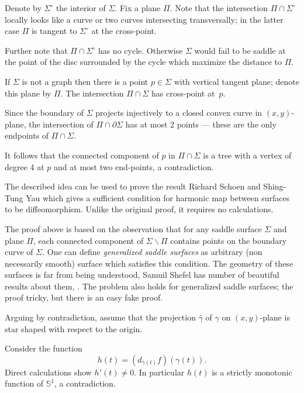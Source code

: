 Denote by $\Sigma^\circ$ the interior of $\Sigma$.
Fix a plane $\Pi$. 
Note that the intersection $\Pi\cap \Sigma^\circ$ 
locally  looks like a curve or two curves intersecting transversally;
in the latter case $\Pi$ is tangent to $\Sigma^\circ$ at the cross-point.

Further note that $\Pi\cap \Sigma^\circ$ has no cycle.
Otherwise $\Sigma$ would fail to be saddle at the point of the disc surrounded by the cycle which maximize the distance to $\Pi$.

If $\Sigma$ is not a graph then there is a point $p\in\Sigma$ with vertical tangent plane;
denote this plane by $\Pi$.
The intersection $\Pi\cap\Sigma$ has cross-point at~$p$.

Since the boundary of $\Sigma$ projects injectively to a closed convex curve in $(x,y)$-plane,
the intersection of $\Pi\cap\partial \Sigma$ has at most 2 points --- these are the only endpoints of $\Pi\cap\Sigma$.

It follows that the connected component of $p$ in $\Pi\cap\Sigma$ is a tree 
with a vertex of degree 4 at $p$ and at most two end-points, a contradiction.\qeds

The described idea can be used to prove the result Richard Schoen and Shing-Tung  Yau \cite[see][]{schoen-yau-2D} which gives a sufficient condition for harmonic map between surfaces to be diffeomorphism.
Unlike the original proof, it requires no calculations.

The proof above is based on the observation 
that for any saddle surface $\Sigma$ and plane $\Pi$,
each connected component of $\Sigma\backslash \Pi$ contains points on the boundary curve of $\Sigma$.
One can define \emph{generalized saddle surfaces} as arbitrary (non necessarily smooth) surface which satisfies this condition.
The geometry of these surfaces is far from being understood,
Samuil Shefel has number of beautiful results about them, 
\cite[see][and the references there in]{shefel, AKP-invitation}.
The problem also holds for generalized saddle surfaces;
the proof tricky, but there is an easy fake proof. %


Arguing by contradiction, assume that the projection $\bar\gamma$
of $\gamma$ on $(x, y)$-plane is star shaped with respect to the origin.

Consider the function 
$$h(t)=(d_{\bar\gamma(t)}f)(\gamma(t)).$$
Direct calculations show $h'(t)\ne 0$.
In particular $h(t)$ is a strictly monotonic function of $\mathbb{S}^1$, a contradiction.\qeds

